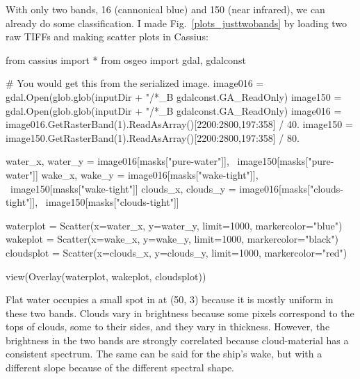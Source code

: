 \documentclass[12pt]{article}
\begin{document}
With only two bands, 16 (cannonical blue) and 150 (near infrared), we
can already do some classification.  I made
Fig.~\ref{plots_justtwobands} by loading two raw TIFFs and making
scatter plots in Cassius:

\begin{python}
from cassius import *
from osgeo import gdal, gdalconst

# You would get this from the serialized image.
image016 = gdal.Open(glob.glob(inputDir + "/*_B%
                     gdalconst.GA_ReadOnly)
image150 = gdal.Open(glob.glob(inputDir + "/*_B%
                     gdalconst.GA_ReadOnly)
image016 = image016.GetRasterBand(1).ReadAsArray()[2200:2800,197:358] / 40.
image150 = image150.GetRasterBand(1).ReadAsArray()[2200:2800,197:358] / 80.

water_x, water_y = image016[masks["pure-water"]], \
                   image150[masks["pure-water"]]
wake_x, wake_y = image016[masks["wake-tight"]], \
                 image150[masks["wake-tight"]]
clouds_x, clouds_y = image016[masks["clouds-tight"]], \
                     image150[masks["clouds-tight"]]

waterplot = Scatter(x=water_x, y=water_y, limit=1000, markercolor="blue")
wakeplot = Scatter(x=wake_x, y=wake_y, limit=1000, markercolor="black")
cloudsplot = Scatter(x=clouds_x, y=clouds_y, limit=1000, markercolor="red")

view(Overlay(waterplot, wakeplot, cloudsplot))
\end{python}

Flat water occupies a small spot in at (50, 3) because it is mostly
uniform in these two bands.  Clouds vary in brightness because some
pixels correspond to the tops of clouds, some to their sides, and they vary in
thickness.  However, the brightness in the two bands are strongly
correlated because cloud-material has a consistent spectrum.  The same
can be said for the ship's wake, but with a different slope because of
the different spectral shape.
\end{document}
